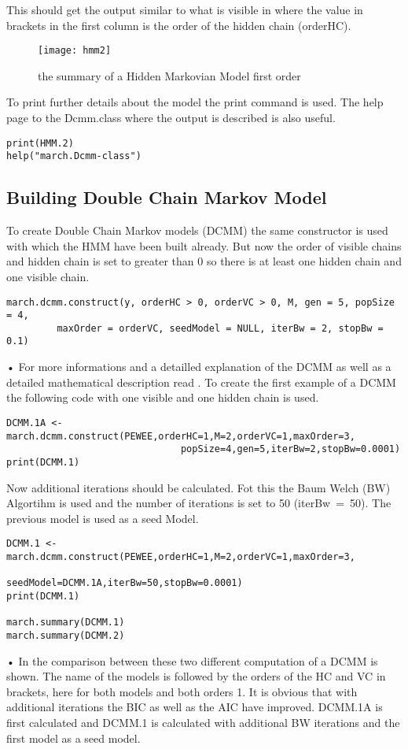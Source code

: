 This should get the output similar to what is visible in  where the value in brackets in the first column is the order of the hidden chain (orderHC). 
\begin{figure}[h]
    \centering
    \texttt{[image: hmm2]}
    \caption{the summary of a Hidden Markovian Model first order}
    \label{fig:hmm2}
\end{figure}
To print further details about the model the print command is used. The help page to the Dcmm.class where the output is described is also useful. 
\begin{verbatim}
print(HMM.2)
help("march.Dcmm-class")
\end{verbatim}

\subsection{Building Double Chain Markov Model}
To create Double Chain Markov models (DCMM) the same constructor is used with which the HMM have been built already. But now the order of visible chains and hidden chain is set to greater than 0 so there is at least one hidden chain and one visible chain.
\begin{verbatim}
march.dcmm.construct(y, orderHC > 0, orderVC > 0, M, gen = 5, popSize = 4,
         maxOrder = orderVC, seedModel = NULL, iterBw = 2, stopBw = 0.1)
\end{verbatim}•
 For more informations and a detailled explanation of the DCMM as well as a detailed mathematical description read \cite {Berchtold2002}.
To create the first example of a DCMM the following code with one visible and one hidden chain is used. 
\begin{verbatim}
DCMM.1A <- march.dcmm.construct(PEWEE,orderHC=1,M=2,orderVC=1,maxOrder=3,
                               popSize=4,gen=5,iterBw=2,stopBw=0.0001)
print(DCMM.1)
\end{verbatim}
Now additional iterations should be calculated. Fot this the Baum Welch (BW) Algortihm is used and the number of iterations  is set to 50 (iterBw~=~50). The previous model is used as a seed Model. 
\begin{verbatim}
DCMM.1 <- march.dcmm.construct(PEWEE,orderHC=1,M=2,orderVC=1,maxOrder=3,
                               seedModel=DCMM.1A,iterBw=50,stopBw=0.0001)
print(DCMM.1)

march.summary(DCMM.1)
march.summary(DCMM.2)
\end{verbatim}•
In  the comparison between these two different computation of a DCMM is shown. The name of the models is followed by the orders of the HC and VC in brackets, here for both models and both orders 1. It is obvious that with additional iterations the BIC as well as the AIC have improved. DCMM.1A is first calculated and DCMM.1 is calculated with additional BW iterations and the first model as a seed model.
